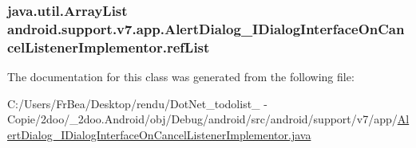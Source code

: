 \hypertarget{classandroid_1_1support_1_1v7_1_1app_1_1_alert_dialog___i_dialog_interface_on_cancel_listener_implementor_8218b03a462abb0277f01ff09099d912}{
\subsubsection[{refList}]{\setlength{\rightskip}{0pt plus 5cm}java.util.ArrayList {\bf android.support.v7.app.AlertDialog\_\-IDialogInterfaceOnCancelListenerImplementor.refList}}}
\label{classandroid_1_1support_1_1v7_1_1app_1_1_alert_dialog___i_dialog_interface_on_cancel_listener_implementor_8218b03a462abb0277f01ff09099d912}




The documentation for this class was generated from the following file:\begin{CompactItemize}
\item 
C:/Users/FrBea/Desktop/rendu/DotNet\_\-todolist\_ - Copie/2doo/\_\-2doo.Android/obj/Debug/android/src/android/support/v7/app/\hyperlink{_alert_dialog___i_dialog_interface_on_cancel_listener_implementor_8java}{AlertDialog\_\-IDialogInterfaceOnCancelListenerImplementor.java}\end{CompactItemize}
